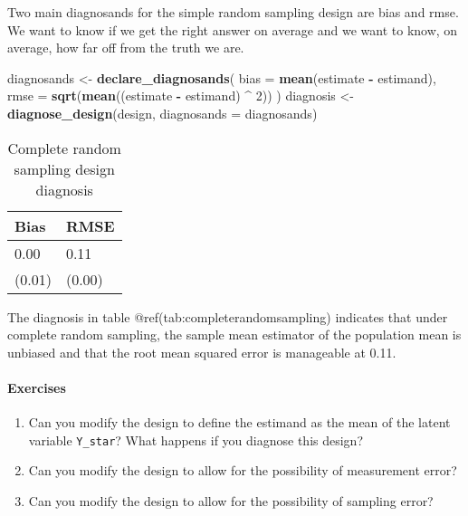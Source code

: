 \documentclass[
]{article}
\newenvironment{Shaded}{\begin{snugshade}}{\end{snugshade}}
\newcommand{\DataTypeTok}[1]{\textcolor[rgb]{0.13,0.29,0.53}{#1}}
\newcommand{\DecValTok}[1]{\textcolor[rgb]{0.00,0.00,0.81}{#1}}
\newcommand{\KeywordTok}[1]{\textcolor[rgb]{0.13,0.29,0.53}{\textbf{#1}}}
\newcommand{\NormalTok}[1]{#1}
\newcommand{\OperatorTok}[1]{\textcolor[rgb]{0.81,0.36,0.00}{\textbf{#1}}}
\newcommand{\StringTok}[1]{\textcolor[rgb]{0.31,0.60,0.02}{#1}}
\providecommand{\tightlist}{%
  \setlength{\itemsep}{0pt}\setlength{\parskip}{0pt}}
\begin{document}
Two main diagnosands for the simple random sampling design are bias and
rmse. We want to know if we get the right answer on average and we want
to know, on average, how far off from the truth we are.

\begin{Shaded}
\begin{Highlighting}[]
\NormalTok{diagnosands <-}\StringTok{ }\KeywordTok{declare_diagnosands}\NormalTok{(}
  \DataTypeTok{bias =} \KeywordTok{mean}\NormalTok{(estimate }\OperatorTok{-}\StringTok{ }\NormalTok{estimand),}
  \DataTypeTok{rmse =} \KeywordTok{sqrt}\NormalTok{(}\KeywordTok{mean}\NormalTok{((estimate }\OperatorTok{-}\StringTok{ }\NormalTok{estimand) }\OperatorTok{^}\StringTok{ }\DecValTok{2}\NormalTok{))}
\NormalTok{)}
\NormalTok{diagnosis <-}\StringTok{ }\KeywordTok{diagnose_design}\NormalTok{(design, }\DataTypeTok{diagnosands =}\NormalTok{ diagnosands) }
\end{Highlighting}
\end{Shaded}

\begin{table}

\caption{\label{tab:completerandomsampling}Complete random sampling design diagnosis}
\centering
\begin{tabular}[t]{ll}
\toprule
Bias & RMSE\\
\midrule
0.00 & 0.11\\
(0.01) & (0.00)\\
\bottomrule
\end{tabular}
\end{table}

The diagnosis in table @ref(tab:completerandomsampling) indicates that
under complete random sampling, the sample mean estimator of the
population mean is unbiased and that the root mean squared error is
manageable at 0.11.

\hypertarget{exercises}{%
\paragraph{Exercises}\label{exercises}}

\begin{enumerate}
\def\labelenumi{\arabic{enumi}.}
\tightlist
\item
  Can you modify the design to define the estimand as the mean of the
  latent variable \texttt{Y\_star}? What happens if you diagnose this
  design?
\item
  Can you modify the design to allow for the possibility of measurement
  error?
\item
  Can you modify the design to allow for the possibility of sampling
  error?
\end{enumerate}
\end{document}
